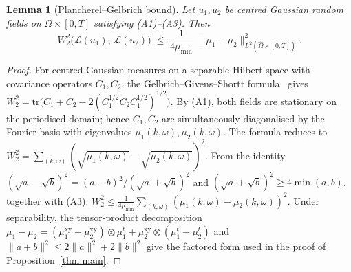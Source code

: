 \documentclass[review,12pt]{elsarticle}
\newtheorem{lemma}{Lemma}
\begin{document}
\begin{lemma}[Plancherel--Gelbrich bound]
\label{lem:gelbrich}
Let \(u_1, u_2\) be centred Gaussian random fields on
\(\Omega \times [0,T]\) satisfying (A1)--(A3). Then
\[
W_2^2\bigl(\mathcal L(u_1),\,\mathcal L(u_2)\bigr)
\;\le\; \frac{1}{4\mu_{\min}}\;
\|\mu_1 - \mu_2\|^2_{L^2(\widehat\Omega \times [0,T])}.
\]
\end{lemma}
\begin{proof}
For centred Gaussian measures on a separable Hilbert space with
covariance operators \(C_1, C_2\), the Gelbrich--Givens--Shortt
formula~\cite{Gelbrich1990,GivensShortt1984} gives
\(W_2^2 = \mathrm{tr}\bigl(C_1 + C_2
- 2(C_1^{1/2} C_2 C_1^{1/2})^{1/2}\bigr)\).
By (A1), both fields are stationary on the periodised domain;
hence \(C_1, C_2\) are simultaneously diagonalised by the Fourier
basis with eigenvalues \(\mu_1(k,\omega), \mu_2(k,\omega)\). The
formula reduces to
\(W_2^2 = \sum_{(k,\omega)}
(\sqrt{\mu_1(k,\omega)} - \sqrt{\mu_2(k,\omega)})^2\).
From the identity
\((\sqrt a - \sqrt b)^2 = (a-b)^2/(\sqrt a + \sqrt b)^2\)
and \((\sqrt a + \sqrt b)^2 \ge 4\min(a,b)\), together with (A3):
\(W_2^2 \le \frac{1}{4\mu_{\min}}
\sum_{(k,\omega)} (\mu_1(k,\omega) - \mu_2(k,\omega))^2\).
Under separability, the tensor-product decomposition
\(\mu_1 - \mu_2 = (\mu_1^{\mathrm{xy}} - \mu_2^{\mathrm{xy}})
\otimes \mu_1^t + \mu_2^{\mathrm{xy}} \otimes
(\mu_1^t - \mu_2^t)\) and \(\|a+b\|^2 \le 2\|a\|^2 + 2\|b\|^2\)
give the factored form used in the proof of
Proposition~\ref{thm:main}.
\end{proof}
\end{document}

